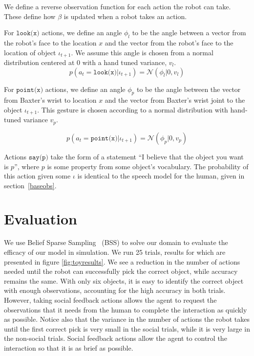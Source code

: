 \documentclass[conference]{IEEEtran}
\begin{document}
We define a reverse observation function for each action the robot can take. These define how $\beta$ is updated when a robot takes an action. 

For $\texttt{look(x)}$ actions, we define an angle $\phi_l$ to be the angle between a vector from the robot's face to the location $x$ and the vector from the robot's face to the location of object $\iota_{t+1}$. We assume this angle is chosen from a normal distribution centered at 0 with a hand tuned variance, $v_l$. 
$$p(a_{t} = \texttt{look(x)} | \iota_{t+1}) = \mathcal{N}(\phi_l | 0, v_{l})$$

For $\texttt{point(x)}$ actions, we define an angle $\phi_p$ to be the angle between the vector from Baxter's wrist to location $x$ and the vector from Baxter's wrist joint to the object $\iota_{t+1}$. This gesture is chosen according to a normal distribution with hand-tuned variance $v_p$. 

$$p(a_{t} = \texttt{point(x)} | \iota_{t+1}) = \mathcal{N}(\phi_p | 0, v_{p})$$

Actions $\texttt{say(p)}$ take the form of a statement ``I believe that the object you want is $p$'', where $p$ is some property from some object's vocabulary. The probability of this action given some $\iota$ is identical to the speech model for the human, given in section~\ref{baseobs}. 

\section{Evaluation}

We use Belief Sparse Sampling~\citep{bss} (BSS) to solve our domain to evaluate the efficacy of our model in simulation. We run 25 trials, results for which are presented in figure \ref{fig:toyresults}. We see a reduction in the number of actions needed until the robot can successfully pick the correct object, while accuracy remains the same. With only six objects, it is easy to identify the correct object with enough observations, accounting for the high accuracy in both trials. However, taking social feedback actions allows the agent to request the observations that it needs from the human to complete the interaction as quickly as possible. Notice also that the variance in the number of actions the robot takes until the first correct pick is very small in the social trials, while it is very large in the non-social trials. Social feedback actions allow the agent to control the interaction so that it is as brief as possible. 
\end{document}
